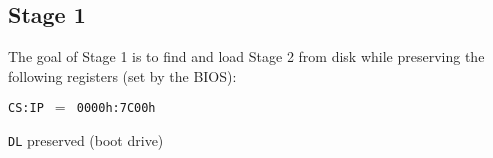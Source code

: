 \subsection{Stage 1}

The goal of Stage 1 is to find and load Stage 2 from disk while preserving the following registers (set by the BIOS):
\begin{description}
	\item \texttt{CS:IP $=$ 0000h:7C00h}
	\item \texttt{DL} preserved (boot drive)
\end{description}
